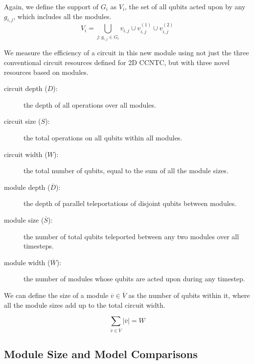 \begin{definition}
\begin{itemize}
Again, we define the support of $G_i$
as $V_i$, the set of all qubits acted upon by any $g_{i,j}$, which
includes all the modules.
\begin{equation}
V_i = \bigcup_{j: g_{i,j} \in G_i} v_{i,j} \cup v^{(1)}_{i,j} \cup v^{(2)}_{i,j} 
\end{equation}

\end{itemize}
\end{definition}

We measure the efficiency of a circuit in this new module using not just
the three conventional circuit resources defined for \textsf{2D CCNTC}, but with three novel resources
based on modules.

\begin{description}

\item[circuit depth ($D$):] the depth of all operations over all modules.
\item[circuit size ($S$):] the total operations on all qubits within all
modules.
\item[circuit width ($W$):] the total number of qubits, equal to the sum of all the module sizes.
\item[module depth ($\overline{D}$):] the depth of parallel teleportations
of disjoint qubits between modules.
\item[module size ($\overline{S}$):] the number of total qubits teleported between any two modules over all timesteps.
\item[module width ($\overline{W}$):] the number of modules whose qubits are
acted upon during any timestep.

\end{description}

We can define the size of a module $\overline{v} \in \overline{V}$
as the number of qubits within it,
where all the module sizes add up to the total circuit width.

\begin{equation}
\sum_{\overline{v} \in \overline{V}} |\overline{v}| = W
\end{equation}

\subsection{Module Size and Model Comparisons}
\label{subsec:module-compare}

